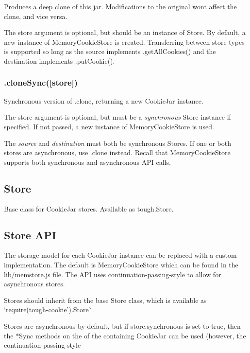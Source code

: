 Produces a deep clone of this jar. Modifications to the original won\textquotesingle{}t affect the clone, and vice versa.

The {\ttfamily store} argument is optional, but should be an instance of {\ttfamily Store}. By default, a new instance of {\ttfamily Memory\+Cookie\+Store} is created. Transferring between store types is supported so long as the source implements {\ttfamily .get\+All\+Cookies()} and the destination implements {\ttfamily .put\+Cookie()}.

\subsubsection*{{\ttfamily .clone\+Sync(\mbox{[}store\mbox{]})}}

Synchronous version of {\ttfamily .clone}, returning a new {\ttfamily Cookie\+Jar} instance.

The {\ttfamily store} argument is optional, but must be a {\itshape synchronous} {\ttfamily Store} instance if specified. If not passed, a new instance of {\ttfamily Memory\+Cookie\+Store} is used.

The {\itshape source} and {\itshape destination} must both be synchronous {\ttfamily Store}s. If one or both stores are asynchronous, use {\ttfamily .clone} instead. Recall that {\ttfamily Memory\+Cookie\+Store} supports both synchronous and asynchronous A\+PI calls.

\subsection*{Store}

Base class for Cookie\+Jar stores. Available as {\ttfamily tough.\+Store}.

\subsection*{Store A\+PI}

The storage model for each {\ttfamily Cookie\+Jar} instance can be replaced with a custom implementation. The default is {\ttfamily Memory\+Cookie\+Store} which can be found in the {\ttfamily lib/memstore.\+js} file. The A\+PI uses continuation-\/passing-\/style to allow for asynchronous stores.

Stores should inherit from the base {\ttfamily Store} class, which is available as `require(\textquotesingle{}tough-\/cookie').Store\`{}.

Stores are asynchronous by default, but if {\ttfamily store.\+synchronous} is set to {\ttfamily true}, then the {\ttfamily $\ast$\+Sync} methods on the of the containing {\ttfamily Cookie\+Jar} can be used (however, the continuation-\/passing style


